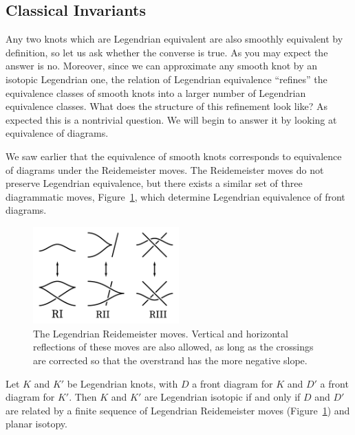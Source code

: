 \subsection{Classical Invariants}\label{subsec:invariants}

Any two knots which are Legendrian equivalent are also smoothly equivalent by definition, so let us ask whether the converse is true.
As you may expect the answer is no. Moreover, since we can approximate any smooth knot by an isotopic Legendrian one, the relation of Legendrian equivalence ``refines'' the equivalence classes of smooth knots into a larger number of Legendrian equivalence classes. What does the structure of this refinement look like? As expected this is a nontrivial question. We will begin to answer it by looking at equivalence of diagrams.

We saw earlier that the equivalence of smooth knots corresponds to equivalence of diagrams under the Reidemeister moves. The Reidemeister moves do not preserve Legendrian equivalence, but there exists a similar set of three diagrammatic moves, Figure~\ref{fig:redemeister}, which determine Legendrian equivalence of front diagrams.

\begin{figure}[ht]
    \centering
    \includegraphics[width=0.5\textwidth]{images/redeimeister.pdf}
    \caption{The Legendrian Reidemeister moves. Vertical and horizontal reflections of these moves are also allowed, as long as the crossings are corrected so that the overstrand has the more negative slope.}%
    \label{fig:redemeister}
\end{figure}

\begin{theorem}
    Let $K$ and $K'$ be Legendrian knots, with $D$ a front diagram for $K$ and $D'$ a front diagram for $K'$.
    Then $K$ and $K'$ are Legendrian isotopic if and only if $D$ and $D'$ are related by a finite sequence of Legendrian Reidemeister moves (Figure~\ref{fig:redemeister}) and planar isotopy.
\end{theorem}

